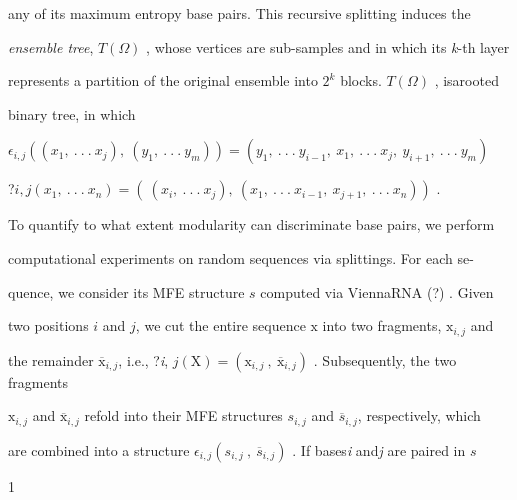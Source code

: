 \documentclass[a4paper,12pt]{article}
\begin{document}
any of its maximum entropy base pairs. This recursive splitting induces the

{\it ensemble tree}, $T(\Omega)$ , whose vertices are sub-samples and in which its {\it k}-th layer

represents a partition of the original ensemble into $2^{k}$ blocks. $T(\Omega)$ , isarooted

binary tree, in which

$\epsilon_{i,j} ((x_{1},\ .\ .\ .\ x_{j}),\ (y_{1},\ .\ .\ .\ y_{m})) = (y_{1},\ .\ .\ .\ y_{i-1},\ x_{1},\ .\ .\ .\ x_{j},\ y_{i+1},\ .\ .\ .\ y_{m})$
\begin{center}
?$i,j (x_{1},\ .\ .\ .\ x_{n}) = (\ (x_{i},\ .\ .\ .\ x_{j}),\ (x_{1},\ .\ .\ .\ x_{i-1},\ x_{j+1},\ .\ .\ .\ x_{n}))$ .
\end{center}
To quantify to what extent modularity can discriminate base pairs, we perform

computational experiments on random sequences via splittings. For each se-

quence, we consider its MFE structure $s$ computed via ViennaRNA (?) . Given

two positions $i$ and $j$, we cut the entire sequence $\mathrm{x}$ into two fragments, $\mathrm{x}_{i,j}$ and

the remainder $\overline{\mathrm{x}}_{i,j}$, i.e., ?{\it i}, $j(\mathrm{X}) = (\mathrm{x}_{i,j}\ ,\ \overline{\mathrm{x}}_{i,j})$ . Subsequently, the two fragments

$\mathrm{x}_{i,j}$ and $\overline{\mathrm{x}}_{i,j}$ refold into their MFE structures $s_{i,j}$ and $\overline{s}_{i,j}$, respectively, which

are combined into a structure $\epsilon_{i,j} (s_{i,j}\ ,\ \overline{s}_{i,j})$ . If bases{\it i} and{\it j} are paired in $s$

1
\end{document}
